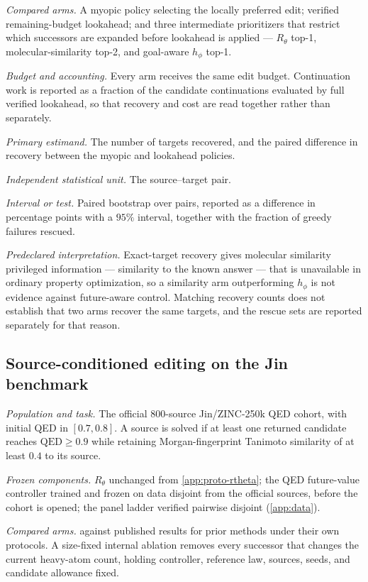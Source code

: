 \emph{Compared arms.} A myopic policy selecting the locally preferred edit; verified remaining-budget lookahead; and three intermediate prioritizers that restrict which successors are expanded before lookahead is applied --- $R_\theta$ top-1, molecular-similarity top-2, and goal-aware $h_\phi$ top-1.

\emph{Budget and accounting.} Every arm receives the same edit budget. Continuation work is reported as a fraction of the candidate continuations evaluated by full verified lookahead, so that recovery and cost are read together rather than separately.

\emph{Primary estimand.} The number of targets recovered, and the paired difference in recovery between the myopic and lookahead policies.

\emph{Independent statistical unit.} The source--target pair.

\emph{Interval or test.} Paired bootstrap over pairs, reported as a difference in percentage points with a $95\%$ interval, together with the fraction of greedy failures rescued.

\emph{Predeclared interpretation.} Exact-target recovery gives molecular similarity privileged information --- similarity to the known answer --- that is unavailable in ordinary property optimization, so a similarity arm outperforming $h_\phi$ is not evidence against future-aware control. Matching recovery counts does not establish that two arms recover the same targets, and the rescue sets are reported separately for that reason.

\subsection{Source-conditioned editing on the Jin benchmark}
\label{app:proto-jin}

\emph{Population and task.} The official $800$-source Jin/ZINC-250k QED cohort, with initial QED in $[0.7,0.8]$. A source is solved if at least one returned candidate reaches $\mathrm{QED}\ge 0.9$ while retaining Morgan-fingerprint Tanimoto similarity of at least $0.4$ to its source.

\emph{Frozen components.} $R_\theta$ unchanged from \cref{app:proto-rtheta}; the QED future-value controller trained and frozen on data disjoint from the official sources, before the cohort is opened; the panel ladder verified pairwise disjoint (\cref{app:data}).

\emph{Compared arms.} \method{} against published results for prior methods under their own protocols. A size-fixed internal ablation removes every successor that changes the current heavy-atom count, holding controller, reference law, sources, seeds, and candidate allowance fixed.

